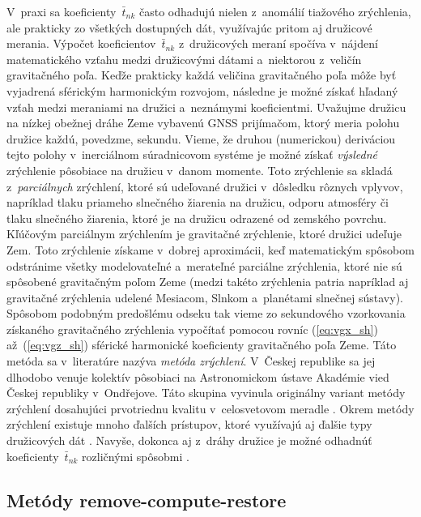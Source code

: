 \documentclass[a4paper, 12pt]{book}
\begin{document}
V~praxi sa koeficienty~$\bar{t}_{nk}$ často odhadujú nielen z~anomálií 
tiažového zrýchlenia, ale prakticky zo všetkých dostupných dát, využívajúc 
pritom aj družicové merania.  Výpočet koeficientov~$\bar{t}_{nk}$ z~družicových 
meraní spočíva v~nájdení matematického vzťahu medzi družicovými dátami 
a~niektorou z~veličín gravitačného poľa.  Keďže prakticky každá veličina 
gravitačného poľa môže byť vyjadrená sférickým harmonickým rozvojom, následne 
je možné získať hľadaný vzťah medzi meraniami na družici a~neznámymi 
koeficientmi.  Uvažujme družicu na nízkej obežnej dráhe Zeme vybavenú GNSS 
prijímačom, ktorý meria polohu družice každú, povedzme, sekundu.  Vieme, že 
druhou (numerickou) deriváciou tejto polohy v~inerciálnom súradnicovom systéme 
je možné získať \emph{výsledné} zrýchlenie pôsobiace na družicu v~danom 
momente.  Toto zrýchlenie sa skladá z~\emph{parciálnych} zrýchlení, ktoré sú 
udeľované družici v~dôsledku rôznych vplyvov, napríklad tlaku priameho 
slnečného žiarenia na družicu, odporu atmosféry či tlaku slnečného žiarenia, 
ktoré je na družicu odrazené od zemského povrchu.  Kľúčovým parciálnym 
zrýchlením je gravitačné zrýchlenie, ktoré družici udeľuje Zem.  Toto 
zrýchlenie získame v~dobrej aproximácii, keď matematickým spôsobom odstránime 
všetky modelovateľné a~merateľné parciálne zrýchlenia, ktoré nie sú spôsobené 
gravitačným poľom Zeme (medzi takéto zrýchlenia patria napríklad aj gravitačné 
zrýchlenia udelené Mesiacom, Slnkom a~planétami slnečnej sústavy).  Spôsobom 
podobným predošlému odseku tak vieme zo sekundového vzorkovania získaného 
gravitačného zrýchlenia vypočítať pomocou rovníc (\ref{eq:vgx_sh}) 
až~(\ref{eq:vgz_sh}) sférické harmonické koeficienty gravitačného poľa Zeme.  
Táto metóda sa v~literatúre nazýva \emph{metóda zrýchlení}.   V~Českej 
republike sa jej dlhodobo venuje kolektív pôsobiaci na Astronomickom ústave 
Akadémie vied Českej republiky v~Ond\v{r}ejove.  Táto skupina vyvinula 
originálny variant metódy zrýchlení dosahujúci prvotriednu kvalitu 
v~celosvetovom meradle \parencite{Bezdek2014,encarnacao2020}.  Okrem metódy 
zrýchlení existuje mnoho ďalších prístupov, ktoré využívajú aj ďalšie typy 
družicových dát \parencite[pozri][]{SeeberSatelliteGeodesy}.  Navyše, dokonca 
aj z~dráhy družice je možné odhadnúť koeficienty~$\bar{t}_{nk}$ rozličnými 
spôsobmi \parencite[napríklad][]{Baur2014}.


\subsection{Metódy remove-compute-restore}
\end{document}
